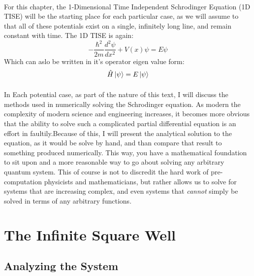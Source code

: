 \documentclass[12pt,letterpaper]{book}
\begin{document}
\paragraph*{}For this chapter, the 1-Dimensional Time Independent Schrodinger Equation (1D TISE) will be the starting place for each particular case, as we will assume to that all of these potentials exist on a single, infinitely long line, and remain constant with time. The 1D TISE is again:
\begin{equation}
\label{1D TISE}
-\frac{\hbar^2}{2m}\frac{d^2 \psi}{dx^2} + V(x)\psi = E\psi
\end{equation}
Which can aslo be written in it's operator eigen value form:
\begin{equation}
\label{1D TISE Eigen}
\hat{H}\ket{\psi} = E\ket{\psi}
\end{equation}
\paragraph*{}In Each potential case, as part of the nature of this text, I will discuss the methods used in numerically solving the Schrodinger equation. As modern the complexity of modern science and engineering increases, it becomes more obvious that the ability to solve such a complicated partial differential equation is an effort in faultily.Because of this, I will present the analytical solution to the equation, as it would be solve by hand, and than compare that result to something produced numerically. This way, you have a mathematical foundation to sit upon and a more reasonable way to go about solving any arbitrary quantum system. This of course is not to discredit the hard work of pre-computation physicists and mathematicians, but rather allows us to solve for systems that are increasing complex, and even systems that \textit{cannot} simply be solved in terms of any arbitrary functions.


\section{The Infinite Square Well}


\subsection*{Analyzing the System}
\end{document}
